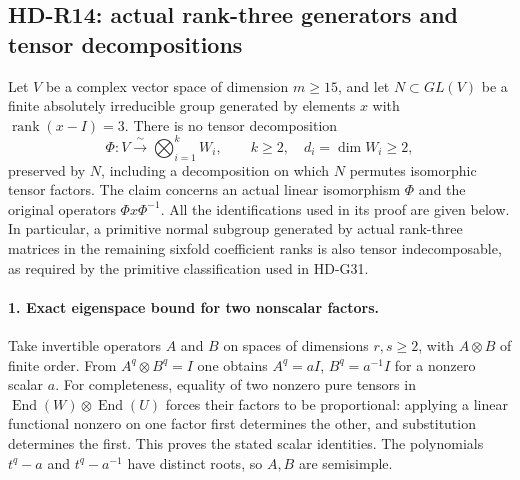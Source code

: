 \subsection{HD-R14: actual rank-three generators and tensor decompositions}
\label{sec:rank-three-tensor-obstruction}

Let \(V\) be a complex vector space of dimension \(m\ge15\),
and let \(N\subset GL(V)\) be a finite absolutely irreducible
group generated by elements \(x\) with
\(\operatorname{rank}(x-I)=3\). There is no tensor
decomposition
\[
 \Phi:V\xrightarrow{\ \sim\ }\bigotimes_{i=1}^{k}W_i,
 \qquad k\ge2,\quad d_i=\dim W_i\ge2,                 \tag{R14.1}
\]
preserved by \(N\), including a decomposition on which
\(N\) permutes isomorphic tensor factors. The claim concerns
an actual linear isomorphism \(\Phi\) and the original
operators \(\Phi x\Phi^{-1}\). All the identifications used
in its proof are given below. In particular, a primitive
normal subgroup generated by actual rank-three matrices in
the remaining sixfold coefficient ranks is also tensor
indecomposable, as required by the primitive classification
used in HD-G31.

\paragraph{1. Exact eigenspace bound for two nonscalar factors.}
Take invertible operators \(A\) and \(B\) on spaces of
dimensions \(r,s\ge2\), with \(A\otimes B\) of finite
order. From
\(A^q\otimes B^q=I\) one obtains
\(A^q=aI\), \(B^q=a^{-1}I\) for a nonzero scalar \(a\).
For completeness, equality of two nonzero pure tensors in
\(\operatorname{End}(W)\otimes\operatorname{End}(U)\)
forces their factors to be proportional: applying a linear
functional nonzero on one factor first determines the other,
and substitution determines the first. This proves the
stated scalar identities. The polynomials \(t^q-a\) and
\(t^q-a^{-1}\) have distinct roots, so \(A,B\) are
semisimple.

